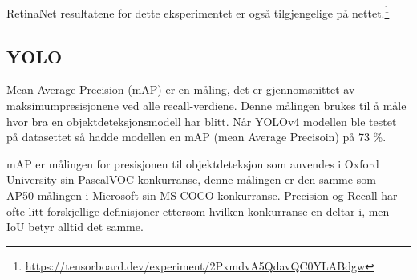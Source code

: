 RetinaNet resultatene for dette eksperimentet er også tilgjengelige på nettet.\footnote{\url{https://tensorboard.dev/experiment/2PxmdvA5QdavQC0YLABdgw}}

\subsection{YOLO}

Mean Average Precision (mAP) er en måling, det er gjennomsnittet av maksimumpresisjonene ved alle recall-verdiene. Denne målingen brukes til å måle hvor bra en objektdeteksjonsmodell har blitt. Når YOLOv4 modellen ble testet på datasettet så hadde modellen en mAP (mean Average Precisoin) på 73 \%.%


mAP er målingen for presisjonen til objektdeteksjon som anvendes i Oxford University sin PascalVOC-konkurranse, denne målingen er den samme som AP50-målingen i Microsoft sin MS COCO-konkurranse. Precision og Recall har ofte litt forskjellige definisjoner ettersom hvilken konkurranse en deltar i, men IoU betyr alltid det samme. \cite{Bochkovskiy 2020}

